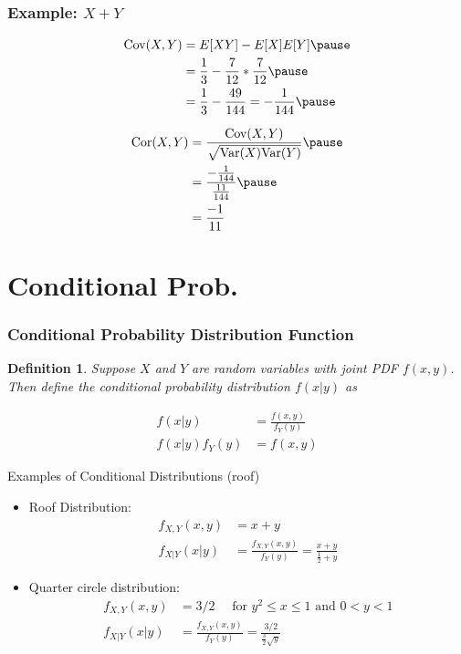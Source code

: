 \documentclass[aspectratio=169, handout]{beamer}
\newtheorem{defn}{Definition}
\numberwithin{equation}{section}
\begin{document}
\begin{frame}
\frametitle{Example: $X + Y$ } 

\begin{align*}
\text{Cov}(X,Y) &=  E[XY] - E[X]E[Y]   \pause \\
&= \frac{1}{3}  - \frac{7}{12} *\frac{7}{12}   \pause \\
&= \frac{1}{3}  - \frac{49}{144} = -\frac{1}{144}   \pause 
\end{align*}

\begin{align*}
\text{Cor}(X,Y) &= \frac{\text{Cov}(X,Y)}{\sqrt{\text{Var}(X) \text{Var}(Y) }} \pause \\
&= \frac{- \frac{1}{144}}{\frac{11}{144}}  \pause  \\
&= \frac{-1}{11}  
\end{align*}


\end{frame}


\section{Conditional Prob.}

\begin{frame}
\frametitle{Conditional Probability Distribution Function}
\begin{defn}
Suppose $X$ and $Y$ are random variables with joint PDF $f(x,y)$.  Then define the \alert{conditional probability distribution} $f(x|y)$ as 

\begin{align*}
f(x|y) &= \frac{f(x, y) }{f_{Y}(y) } \\
f(x|y)f_{Y}(y)&= f(x, y)   
\end{align*}

\end{defn}

\end{frame}



\begin{frame}{Examples of Conditional Distributions (roof)}
\begin{itemize}
\item Roof Distribution:
\begin{align*}
f_{X,Y}(x,y)&=x+y\\
f_{X|Y}(x|y)&=\frac{f_{X,Y}(x,y)}{f_Y(y)}=\frac{x+y}{\frac{1}{2}+y}
\end{align*}
\item Quarter circle distribution:
\begin{align*}
f_{X,Y}(x,y)&=3/2 \quad \text{ for }y^2\leq x\leq 1 \text{ and }0<y<1\\
f_{X|Y}(x|y)&=\frac{f_{X,Y}(x,y)}{f_Y(y)}=\frac{3/2}{\frac{3}{2}\sqrt{y}}
\end{align*}
\end{itemize}


\end{frame}
\end{document}
